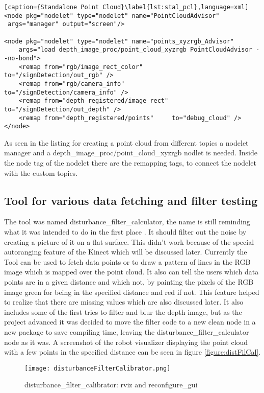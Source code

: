 \begin{lstlisting}[caption={Standalone Point Cloud}\label{lst:stal_pcl},language=xml]
<node pkg="nodelet" type="nodelet" name="PointCloudAdvisor" 
 args="manager" output="screen"/>

<node pkg="nodelet" type="nodelet" name="points_xyzrgb_Advisor" 
	args="load depth_image_proc/point_cloud_xyzrgb PointCloudAdvisor --no-bond">
    <remap from="rgb/image_rect_color"        to="/signDetection/out_rgb" />
    <remap from="rgb/camera_info"             to="/signDetection/camera_info" />
    <remap from="depth_registered/image_rect" to="/signDetection/out_depth" />
    <remap from="depth_registered/points"     to="debug_cloud" />
</node>
\end{lstlisting}

As seen in the listing for creating a point cloud from different topics a nodelet manager and a 
depth\_image\_proc/point\_cloud\_xyzrgb nodlet is needed. Inside the node tag of the nodelet
there are the remapping tags, to connect the nodelet with the custom topics.


\subsection{Tool for various data fetching and filter testing}\label{Sect:disturbancefiltercal}
The tool was named disturbance\_filter\_calculator, the name is still reminding what it was intended to do in the first place
. It should filter out the noise by creating a picture of it on a flat surface. This didn't work because of the special 
autoranging feature of the Kinect which will be discussed later. Currently the Tool can be used to fetch data points or to
draw a pattern of lines in the RGB image which is mapped over the point cloud. It also can tell the users which data points
are in a given distance and which not, by painting the pixels of the RGB image green for being in the specified distance
and red if not. This feature helped to realize that there are missing values which are also discussed later. It also includes
some of the first tries to filter and blur the depth image, but as the project advanced it was decided to move the 
filter code to a new clean node in a new package to save compiling time, leaving the disturbance\_filter\_calculator 
node as it was. A screenshot of the robot visualizer displaying the point cloud with a few points in the specified distance
can be seen in figure \vref{figure:distFilCal}.

\begin{figure}[htp]
\begin{center}
  \texttt{[image: disturbanceFilterCalibrator.png]}
  \caption{disturbance\_filter\_calibrator: rviz and reconfigure\_gui}
  \label{figure:distFilCal}
\end{center}
\end{figure}


